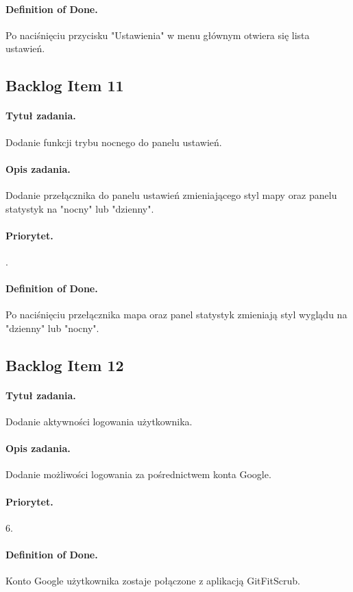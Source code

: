 \documentclass[a4paper]{article}
\begin{document}
\paragraph{Definition of Done.} Po naciśnięciu przycisku "Ustawienia" w menu głównym otwiera się lista ustawień.

\subsection{Backlog Item 11}
\paragraph{Tytuł zadania.} Dodanie funkcji trybu nocnego do panelu ustawień.
\paragraph{Opis zadania.} Dodanie przełącznika do panelu ustawień zmieniającego styl mapy oraz panelu statystyk na "nocny" lub "dzienny".
\paragraph{Priorytet.} .
\paragraph{Definition of Done.} Po naciśnięciu przełącznika mapa oraz panel statystyk zmieniają styl wyglądu na "dzienny" lub "nocny".

\subsection{Backlog Item 12}
\paragraph{Tytuł zadania.} Dodanie aktywności logowania użytkownika.
\paragraph{Opis zadania.} Dodanie możliwości logowania za pośrednictwem konta Google. 
\paragraph{Priorytet.} 6.
\paragraph{Definition of Done.} Konto Google użytkownika zostaje połączone z aplikacją GitFitScrub.
\end{document}

